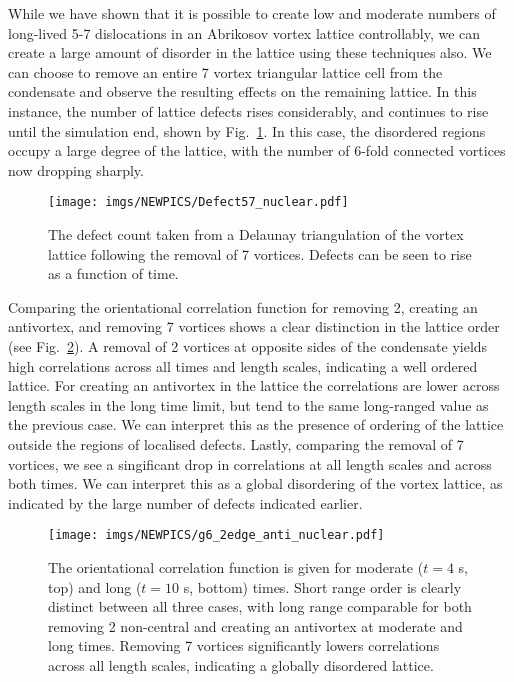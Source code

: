 While we have shown that it is possible to create low and moderate numbers of long-lived 5-7 dislocations in an Abrikosov vortex lattice controllably, we can create a large amount of disorder in the lattice using these techniques also. We can choose to remove an entire 7 vortex triangular lattice cell from the condensate and observe the resulting effects on the remaining lattice. In this instance, the number of lattice defects rises considerably, and continues to rise until the simulation end, shown by Fig.~\ref{fig:remove7_defect}. In this case, the disordered regions occupy a large degree of the lattice, with the number of 6-fold connected vortices now dropping sharply.

\begin{figure}[tb]
    \texttt{[image: imgs/NEWPICS/Defect57\_nuclear.pdf]}
    \caption{The defect count taken from a Delaunay triangulation of the vortex lattice following the removal of 7 vortices. Defects can be seen to rise as a function of time.}\label{fig:remove7_defect}
\end{figure}

Comparing the orientational correlation function for removing 2, creating an antivortex, and removing 7 vortices shows a clear distinction in the lattice order (see Fig.~\ref{fig:g6_2edge_anti_nuclear}). A removal of 2 vortices at opposite sides of the condensate yields high correlations across all times and length scales, indicating a well ordered lattice. For creating an antivortex in the lattice the correlations are lower across length scales in the long time limit, but tend to the same long-ranged value as the previous case. We can interpret this as the presence of ordering of the lattice outside the regions of localised defects. Lastly, comparing the removal of 7 vortices, we see a singificant drop in correlations at all length scales and across both times. We can interpret this as a global disordering of the vortex lattice, as indicated by the large number of defects indicated earlier.

\begin{figure}[bt]
    \texttt{[image: imgs/NEWPICS/g6\_2edge\_anti\_nuclear.pdf]}
    \caption{The orientational correlation function is given for moderate ($t=4$ s, top) and long ($t=10$ s, bottom) times. Short range order is clearly distinct between all three cases, with long range comparable for both removing 2 non-central and creating an antivortex at moderate and long times. Removing 7 vortices significantly lowers correlations across all length scales, indicating a globally disordered lattice.}\label{fig:g6_2edge_anti_nuclear}
\end{figure}



